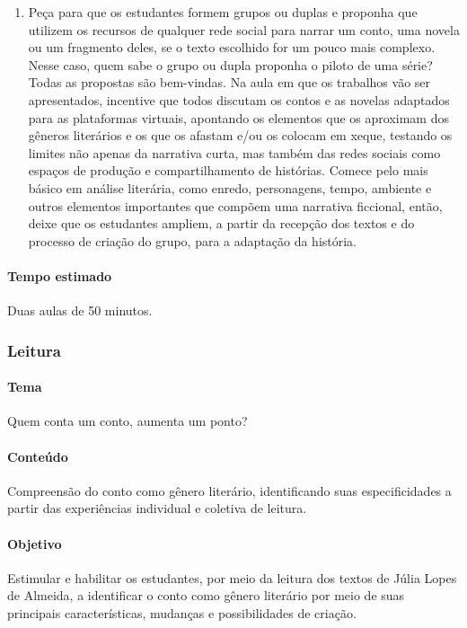 \documentclass[12pt]{extarticle}
\begin{document}
\begin{enumerate}
\item
Peça para que os estudantes formem grupos ou duplas e proponha que
utilizem os recursos de qualquer rede social para narrar um conto, uma
novela ou um fragmento deles, se o texto escolhido for um pouco mais
complexo. Nesse caso, quem sabe o grupo ou dupla proponha o piloto de
uma série? Todas as propostas são bem-vindas. Na aula em que os
trabalhos vão ser apresentados, incentive que todos discutam os contos e
as novelas adaptados para as plataformas virtuais, apontando os
elementos que os aproximam dos gêneros literários e os que os afastam
e/ou os colocam em xeque, testando os limites não apenas da narrativa
curta, mas também das redes sociais como espaços de produção e
compartilhamento de histórias. Comece pelo mais básico em análise
literária, como enredo, personagens, tempo, ambiente e outros elementos
importantes que compõem uma narrativa ficcional, então, deixe que os
estudantes ampliem, a partir da recepção dos textos e do processo de
criação do grupo, para a adaptação da história.
\end{enumerate}

\paragraph{Tempo estimado} Duas aulas de 50 minutos.




\subsubsection{Leitura}



\paragraph{Tema} Quem conta um conto, aumenta um ponto?

\paragraph{Conteúdo} Compreensão do conto como gênero literário,
identificando suas especificidades a partir das experiências individual
e coletiva de leitura.

\paragraph{Objetivo} Estimular e habilitar os estudantes, por meio da
leitura dos textos de Júlia Lopes de Almeida, a identificar o conto como
gênero literário por meio de suas principais características, mudanças e
possibilidades de criação.
\end{document}

